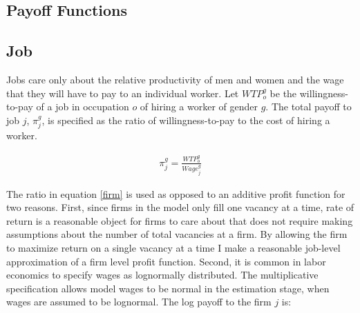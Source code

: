 \documentclass[12pt]{article}
\begin{document}

\subsection{Payoff Functions}
\subsection{Job}


Jobs care only about the relative productivity of men and women and the wage that they will have to pay to an individual worker. Let $WTP^g_o$ be the willingness-to-pay of a job in occupation $o$ of hiring a worker of gender $g$. The total payoff to job $j$, $\pi^g_j$, is specified as the ratio of willingness-to-pay to the cost of hiring a worker.

\begin{align} \label{firm}
 \pi^g_j = \frac{WTP^g_o}{Wage^g_j} 
\end{align}

The ratio in equation \ref{firm} is used as opposed to an additive profit function for two reasons. First, since firms in the model only fill one vacancy at a time, rate of return is a reasonable object for firms to care about that does not require making assumptions about the number of total vacancies at a firm. By allowing the firm to maximize return on a single vacancy at a time I make a reasonable job-level approximation of a firm level profit function. Second, it is common in labor economics to specify wages as lognormally distributed. The multiplicative specification allows model wages to be normal in the estimation stage, when wages are assumed to be lognormal. The log payoff to the firm $j$ is:
\end{document}
